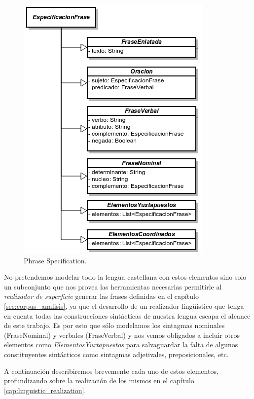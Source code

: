 \begin{figure}[H]
  	\centering
	\includegraphics[scale=0.7]{img/phrase_spec.png}
	\caption{Phrase Specification.}
  	\label{fig:phase_spec}
\end{figure}

No pretendemos modelar todo la lengua castellana con estos elementos sino solo un subconjunto que nos provea las herramientas necesarias permitirle al \emph{realizador de superficie} generar las frases definidas en el capítulo \ref{sec:corpus_analisis}, ya que el desarrollo de un realizador lingüístico que tenga en cuenta todas las construcciones sintácticas de nuestra lengua escapa el alcance de este trabajo. Es por esto que sólo modelamos los sintagmas nominales (FraseNominal) y verbales (FraseVerbal) y nos vemos obligados a incluir otros elementos como \emph{ElementosYuxtapuestos} para salvaguardar la falta de algunos constituyentes sintácticos como sintagmas adjetivales, preposicionales, etc. 

A continuación describiremos brevemente cada uno de estos elementos, profundizando sobre la realización de los mismos en el capítulo \ref{cap:linguistic_realization}.


